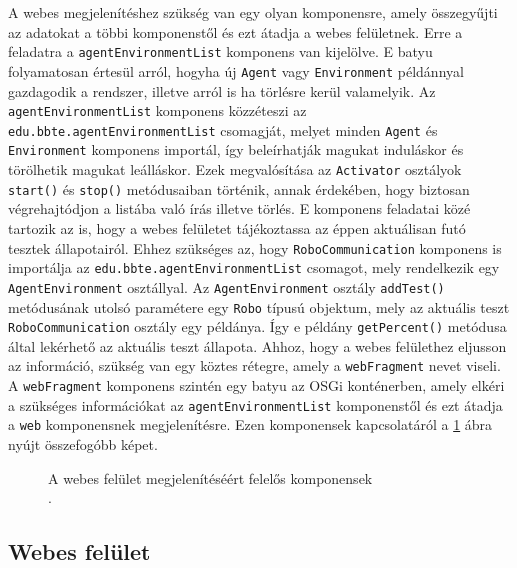 A webes megjelenítéshez szükség van egy olyan komponensre, amely összegyűjti az adatokat a többi komponenstől és ezt átadja a webes felületnek. Erre a feladatra a \texttt{agentEnvironmentList} komponens van kijelölve. E batyu folyamatosan értesül arról, hogyha új \texttt{Agent} vagy \texttt{Environment} példánnyal gazdagodik a rendszer, illetve arról is ha törlésre kerül valamelyik. Az \texttt{agentEnvironmentList} komponens közzéteszi az \texttt{edu.bbte.agentEnvironmentList} csomagját, melyet minden \texttt{Agent} és \texttt{Environment} komponens importál, így beleírhatják magukat induláskor és törölhetik magukat leálláskor. Ezek megvalósítása az \texttt{Activator} osztályok \texttt{start()} és \texttt{stop()} metódusaiban történik, annak érdekében, hogy biztosan végrehajtódjon a listába való írás illetve törlés. E komponens feladatai közé tartozik az is, hogy a webes felületet tájékoztassa az éppen aktuálisan futó tesztek állapotairól. Ehhez szükséges az, hogy  \texttt{RoboCommunication} komponens is importálja az \texttt{edu.bbte.agentEnvironmentList} csomagot, mely rendelkezik egy \texttt{AgentEnvironment} osztállyal. Az \texttt{AgentEnvironment} osztály \texttt{addTest()} metódusának utolsó paramétere egy \texttt{Robo} típusú objektum, mely az aktuális teszt \texttt{RoboCommunication} osztály egy példánya. Így e példány \texttt{getPercent()} metódusa által lekérhető az aktuális teszt állapota. 
Ahhoz, hogy a webes felülethez eljusson az információ, szükség van egy köztes rétegre, amely a \texttt{webFragment} nevet viseli. A \texttt{webFragment} komponens szintén egy batyu az OSGi konténerben, amely elkéri a szükséges információkat az \texttt{agentEnvironmentList} komponenstől és ezt átadja a \texttt{web} komponensnek megjelenítésre. Ezen komponensek kapcsolatáról a \ref{fig:agentEnvironmentListKomponens} ábra nyújt összefogóbb képet.

\begin{figure}[h!]
  \centering
  \caption[A webes felület megjelenítéséért felelős komponensek]%
  {A webes felület megjelenítéséért felelős komponensek\\
  {\white .}\hfill\url{}}
  \label{fig:agentEnvironmentListKomponens}
\end{figure}

\subsection{Webes felület}\label{subsec:WebesFelulet}

